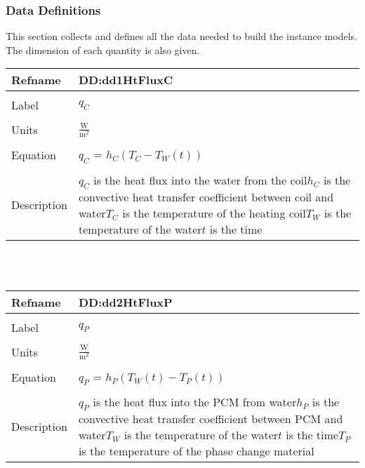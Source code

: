 \documentclass[12pt]{article}
\begin{document}
\subsubsection{Data Definitions}
\label{Sec:DD}
This section collects and defines all the data needed to build the instance models. The dimension of each quantity is also given.
~\newline
\noindent \begin{minipage}{\textwidth}
\begin{tabular}{p{} p{}}
\toprule \textbf{Refname} & \textbf{DD:dd1HtFluxC}
\label{DD:dd1HtFluxC}
\\ \midrule \\
Label & $q_{C}$
\\ \midrule \\
Units & $\frac{\text{W}}{\text{m}^{2}}$
\\ \midrule \\
Equation & $q_{C}$ = $h_{C}(T_{C}-T_{W}(t))$
\\ \midrule \\
Description & $q_{C}$ is the heat flux into the water from the coil\newline$h_{C}$ is the convective heat transfer coefficient between coil and water\newline$T_{C}$ is the temperature of the heating coil\newline$T_{W}$ is the temperature of the water\newline$t$ is the time
\\ \bottomrule \end{tabular}
\end{minipage}\\
~\newline
\noindent \begin{minipage}{\textwidth}
\begin{tabular}{p{} p{}}
\toprule \textbf{Refname} & \textbf{DD:dd2HtFluxP}
\label{DD:dd2HtFluxP}
\\ \midrule \\
Label & $q_{P}$
\\ \midrule \\
Units & $\frac{\text{W}}{\text{m}^{2}}$
\\ \midrule \\
Equation & $q_{P}$ = $h_{P}(T_{W}(t)-T_{P}(t))$
\\ \midrule \\
Description & $q_{P}$ is the heat flux into the PCM from water\newline$h_{P}$ is the convective heat transfer coefficient between PCM and water\newline$T_{W}$ is the temperature of the water\newline$t$ is the time\newline$T_{P}$ is the temperature of the phase change material
\\ \bottomrule \end{tabular}
\end{minipage}\\
\end{document}
